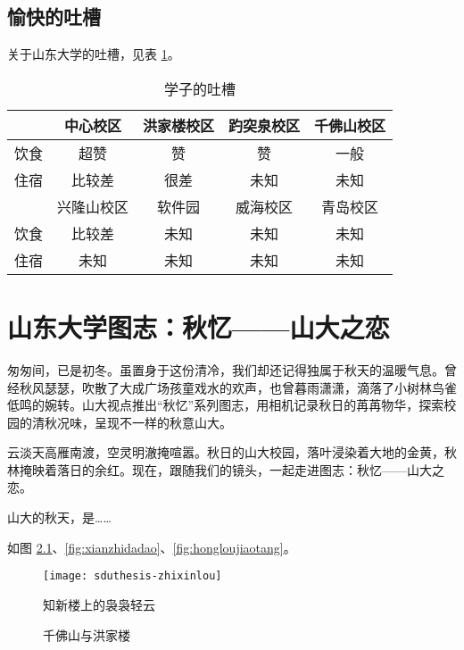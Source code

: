 \documentclass{sduthesis}
\begin{document}
\section{愉快的吐槽}

关于山东大学的吐槽，见表 \ref{tab:debunk}。

\begin{table}[!htb]
\centering
\caption{学子的吐槽}\label{tab:debunk}
\begin{tabular}{*5{c}}
  \toprule
  & 中心校区 & 洪家楼校区 & 趵突泉校区 & 千佛山校区 \\
  \midrule
  饮食 & 超赞 & 赞 & 赞 & 一般 \\
  住宿 & 比较差 & 很差 & 未知 & 未知\\
  \midrule[0.8pt]
  & 兴隆山校区 & 软件园 & 威海校区 & 青岛校区 \\
  \midrule
  饮食 & 比较差 & 未知 & 未知 & 未知 \\
  住宿 & 未知 & 未知 & 未知 & 未知\\
  \bottomrule
\end{tabular}
\end{table}

\chapter{山东大学图志：秋忆——山大之恋}

匆匆间，已是初冬。虽置身于这份清冷，我们却还记得独属于秋天的温暖气息。曾经秋风瑟瑟，吹散了大成广场孩童戏水的欢声，也曾暮雨潇潇，滴落了小树林鸟雀低鸣的婉转。山大视点推出“秋忆”系列图志，用相机记录秋日的苒苒物华，探索校园的清秋况味，呈现不一样的秋意山大。

云淡天高雁南渡，空灵明澈掩喧嚣。秋日的山大校园，落叶浸染着大地的金黄，秋林掩映着落日的余红。现在，跟随我们的镜头，一起走进图志：秋忆——山大之恋。

山大的秋天，是……

如图 \ref{fig:zhixinlou}、\ref{fig:xianzhidadao}、\ref{fig:hongloujiaotang}。

\begin{figure}[!htb]
\centering
\texttt{[image: sduthesis-zhixinlou]}
\caption{知新楼上的袅袅轻云}\label{fig:zhixinlou}
\end{figure}

\begin{figure}[!htb]
\centering
{}\quad
{}\quad
\caption{千佛山与洪家楼}
\end{figure}
\end{document}
